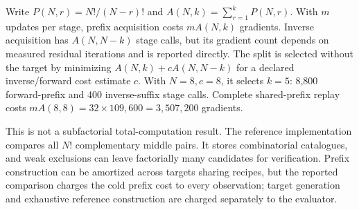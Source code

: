 Write $P(N,r)=N!/(N-r)!$ and $A(N,k)=\sum_{r=1}^k P(N,r)$. With $m$ updates per stage, prefix acquisition costs $mA(N,k)$ gradients. Inverse acquisition has $A(N,N-k)$ stage calls, but its gradient count depends on measured residual iterations and is reported directly. The split is selected without the target by minimizing $A(N,k)+cA(N,N-k)$ for a declared inverse/forward cost estimate $c$. With $N=8,c=8$, it selects $k=5$: 8,800 forward-prefix and 400 inverse-suffix stage calls. Complete shared-prefix replay costs $mA(8,8)=32\times109,600=3,507,200$ gradients.

This is not a subfactorial total-computation result. The reference implementation compares all $N!$ complementary middle pairs. It stores combinatorial catalogues, and weak exclusions can leave factorially many candidates for verification. Prefix construction can be amortized across targets sharing recipes, but the reported comparison charges the cold prefix cost to every observation; target generation and exhaustive reference construction are charged separately to the evaluator.

